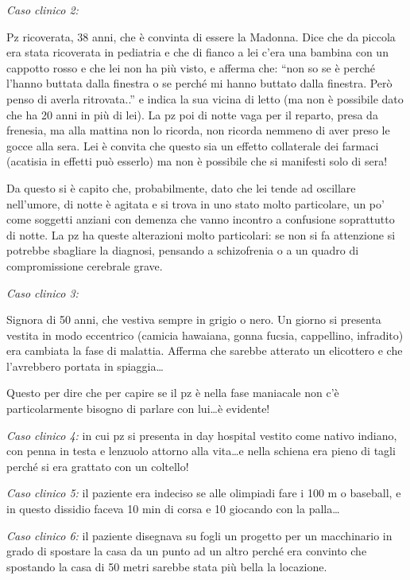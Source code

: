 \emph{Caso clinico 2:}

Pz ricoverata, 38 anni, che è convinta di essere la Madonna. Dice che da
piccola era stata ricoverata in pediatria e che di fianco a lei c'era
una bambina con un cappotto rosso e che lei non ha più visto, e afferma
che: ``non so se è perché l'hanno buttata dalla finestra o se perché mi
hanno buttato dalla finestra. Però penso di averla ritrovata..'' e
indica la sua vicina di letto (ma non è possibile dato che ha 20 anni in
più di lei). La pz poi di notte vaga per il reparto, presa da frenesia,
ma alla mattina non lo ricorda, non ricorda nemmeno di aver preso le
gocce alla sera. Lei è convita che questo sia un effetto collaterale dei
farmaci (acatisia in effetti può esserlo) ma non è possibile che si
manifesti solo di sera!

Da questo si è capito che, probabilmente, dato che lei tende ad
oscillare nell'umore, di notte è agitata e si trova in uno stato molto
particolare, un po' come soggetti anziani con demenza che vanno incontro
a confusione soprattutto di notte. La pz ha queste alterazioni molto
particolari: se non si fa attenzione si potrebbe sbagliare la diagnosi,
pensando a schizofrenia o a un quadro di compromissione cerebrale grave.

\emph{Caso clinico 3:}

Signora di 50 anni, che vestiva sempre in grigio o nero. Un giorno si
presenta vestita in modo eccentrico (camicia hawaiana, gonna fucsia,
cappellino, infradito) era cambiata la fase di malattia. Afferma che
sarebbe atterato un elicottero e che l'avrebbero portata in
spiaggia\ldots{}

Questo per dire che per capire se il pz è nella fase maniacale non c'è
particolarmente bisogno di parlare con lui\ldots{}è evidente!

\emph{Caso clinico 4:} in cui pz si presenta in day hospital vestito
come nativo indiano, con penna in testa e lenzuolo attorno alla
vita\ldots{}e nella schiena era pieno di tagli perché si era grattato
con un coltello!

\emph{Caso clinico 5:} il paziente era indeciso se alle olimpiadi fare i
100 m o baseball, e in questo dissidio faceva 10 min di corsa e 10
giocando con la palla\ldots{}

\emph{Caso clinico 6:} il paziente disegnava su fogli un progetto per un
macchinario in grado di spostare la casa da un punto ad un altro perché
era convinto che spostando la casa di 50 metri sarebbe stata più bella
la locazione.

